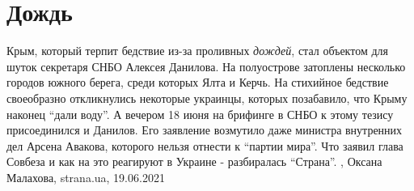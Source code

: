  
 
 
 
 
\chapter{Дождь}
\label{sec:slova.dozhd}

Крым, который терпит бедствие из-за проливных \emph{дождей}, стал объектом для шуток
секретаря СНБО Алексея Данилова. 
На полуострове затоплены несколько городов южного берега, среди которых Ялта и
Керчь. На стихийное бедствие своеобразно откликнулись некоторые украинцы,
которых позабавило, что Крыму наконец \enquote{дали воду}.
А вечером 18 июня на брифинге в СНБО к этому тезису присоединился и Данилов.
Его заявление возмутило даже министра внутренних дел Арсена Авакова, которого
нельзя отнести к \enquote{партии мира}. 
Что заявил глава Совбеза и как на это реагируют в Украине - разбиралась
\enquote{Страна}.
, 
Оксана Малахова, strana.ua, 19.06.2021
